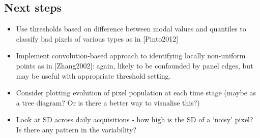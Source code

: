 \documentclass[10pt,fleqn]{article}
\begin{document}
\subsection*{Next steps}

\begin{itemize}

\item
Use thresholds based on difference between modal values and quantiles to classify bad pixels of various types as in [Pinto2012]

\item
Implement convolution-based approach to identifying locally non-uniform points as in [Zhang2002]: again, likely to be confounded by panel edges, but may be useful with appropriate threshold setting.

\item
Consider plotting evolution of pixel population at each time stage (maybe as a tree diagram? Or is there a better way to visualise this?)

\item
Look at SD across daily acquisitions - how high is the SD of a `noisy' pixel? Is there any pattern in the variability? 



\end{itemize}

\end{document}

